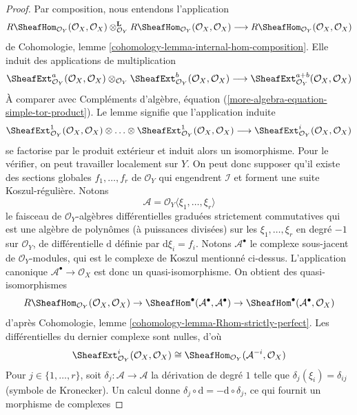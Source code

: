 \begin{proof}
Par composition, nous entendons l'application
$$
R\SheafHom_{\mathcal{O}_Y}(\mathcal{O}_X, \mathcal{O}_X)
\otimes_{\mathcal{O}_Y}^\mathbf{L}
R\SheafHom_{\mathcal{O}_Y}(\mathcal{O}_X, \mathcal{O}_X)
\longrightarrow
R\SheafHom_{\mathcal{O}_Y}(\mathcal{O}_X, \mathcal{O}_X)
$$
de Cohomologie, lemme \ref{cohomology-lemma-internal-hom-composition}. Elle induit des applications de multiplication
$$
\SheafExt^a_{\mathcal{O}_Y}(\mathcal{O}_X, \mathcal{O}_X)
\otimes_{\mathcal{O}_Y}
\SheafExt^b_{\mathcal{O}_Y}(\mathcal{O}_X, \mathcal{O}_X)
\longrightarrow
\SheafExt^{a + b}_{\mathcal{O}_Y}(\mathcal{O}_X, \mathcal{O}_X)
$$
À comparer avec Compléments d'algèbre, équation (\ref{more-algebra-equation-simple-tor-product}). Le lemme signifie que l'application induite
$$
\SheafExt^1_{\mathcal{O}_Y}(\mathcal{O}_X, \mathcal{O}_X)
\otimes \ldots \otimes
\SheafExt^1_{\mathcal{O}_Y}(\mathcal{O}_X, \mathcal{O}_X)
\longrightarrow
\SheafExt^i_{\mathcal{O}_Y}(\mathcal{O}_X, \mathcal{O}_X)
$$
se factorise par le produit extérieur et induit alors un isomorphisme. Pour le vérifier, on peut travailler localement sur $Y$. On peut donc supposer qu'il existe des sections globales $f_1, \ldots, f_r$ de $\mathcal{O}_Y$ qui engendrent $\mathcal{I}$ et forment une suite Koszul-régulière. Notons
$$
\mathcal{A} = \mathcal{O}_Y\langle \xi_1, \ldots, \xi_r\rangle
$$
le faisceau de $\mathcal{O}_Y$-algèbres différentielles graduées strictement commutatives qui est une algèbre de polynômes (à puissances divisées) sur les $\xi_1, \ldots, \xi_r$ en degré $-1$ sur $\mathcal{O}_Y$, de différentielle $\text{d}$ définie par $\text{d}\xi_i = f_i$. Notons $\mathcal{A}^\bullet$ le complexe sous-jacent de $\mathcal{O}_Y$-modules, qui est le complexe de Koszul mentionné ci-dessus. L'application canonique
$\mathcal{A}^\bullet \to \mathcal{O}_X$
est donc un quasi-isomorphisme. On obtient des quasi-isomorphismes
$$
R\SheafHom_{\mathcal{O}_Y}(\mathcal{O}_X, \mathcal{O}_X) \to
\SheafHom^\bullet(\mathcal{A}^\bullet, \mathcal{A}^\bullet) \to
\SheafHom^\bullet(\mathcal{A}^\bullet, \mathcal{O}_X)
$$
d'après Cohomologie, lemme \ref{cohomology-lemma-Rhom-strictly-perfect}. Les différentielles du dernier complexe sont nulles, d'où
$$
\SheafExt^i_{\mathcal{O}_Y}(\mathcal{O}_X, \mathcal{O}_X)
\cong \SheafHom_{\mathcal{O}_Y}(\mathcal{A}^{-i}, \mathcal{O}_X)
$$
Pour $j \in \{1, \ldots, r\}$, soit $\delta_j : \mathcal{A} \to \mathcal{A}$ la dérivation de degré $1$ telle que $\delta_j(\xi_i) = \delta_{ij}$ (symbole de Kronecker). Un calcul donne $\delta_j \circ \text{d} = - \text{d} \circ \delta_j$, ce qui fournit un morphisme de complexes

\end{proof}
